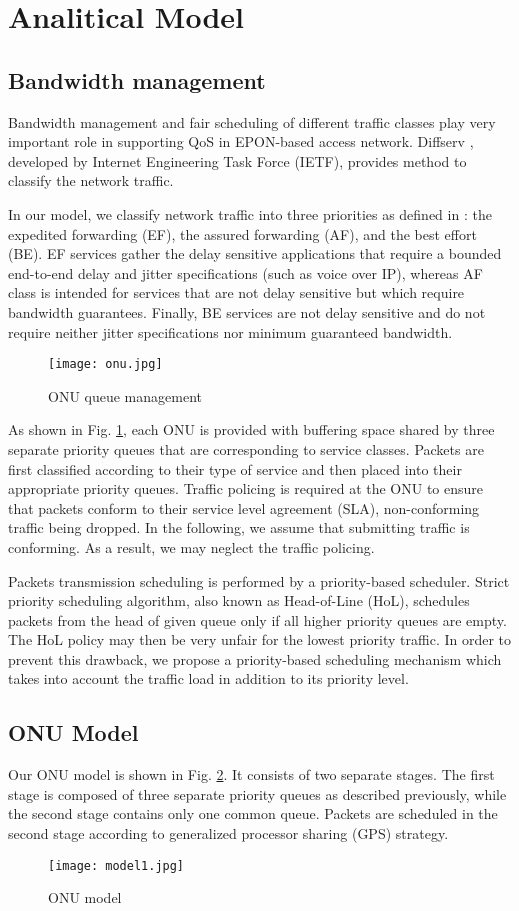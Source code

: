 \documentclass[a4paper,10pt]{IEEEtran}
\begin{document}
\section{Analitical Model}
\subsection{Bandwidth management}
Bandwidth management and fair scheduling of different traffic
classes play very important role in supporting QoS in EPON-based
access network. Diffserv \cite{Diffserv:1998}, developed by Internet
Engineering Task Force (IETF), provides method to classify the
network traffic.

In our model, we classify network traffic into three priorities as
defined in \cite{Diffserv:1998}: the expedited forwarding (EF), the
assured forwarding (AF), and the best effort (BE). EF services
gather the delay sensitive applications that require a bounded
end-to-end delay and jitter specifications (such as voice over IP),
whereas AF class is intended for services that are not delay
sensitive but which require bandwidth guarantees. Finally, BE
services are not delay sensitive and do not require neither jitter
specifications nor minimum guaranteed bandwidth.
\begin{figure}[!h]
\centering
\texttt{[image: onu.jpg]}
\caption{ONU queue management} \label{onu-management}
\end{figure}
As shown in Fig. \ref{onu-management}, each ONU is provided with
buffering space shared by three separate priority queues that are
corresponding to service classes. Packets are first classified
according to their type of service and then placed into their
appropriate priority queues. Traffic policing is required at the ONU
to ensure that packets conform to their service level agreement
(SLA), non-conforming traffic being dropped. In the following, we
assume that submitting traffic is conforming. As a result, we may
neglect the traffic policing.

Packets transmission scheduling is performed by a priority-based
scheduler. Strict priority scheduling algorithm, also known as
Head-of-Line (HoL), schedules packets from the head of given queue
only if all higher priority queues are empty. The HoL policy may
then be very unfair for the lowest priority traffic. In order to
prevent this drawback, we propose a priority-based scheduling
mechanism which takes into account the traffic load in addition to
its priority level.
\subsection{ONU Model}
Our ONU model is shown in Fig. \ref{onu-model1}. It consists of two
separate stages. The first stage is composed of three separate
priority queues as described previously, while the second stage
contains only one common queue. Packets are scheduled in the second
stage according to generalized processor sharing (GPS) strategy.
\begin{figure}[!h]
\centering
\texttt{[image: model1.jpg]}
\caption{ONU model} \label{onu-model1}
\end{figure}
\end{document}
